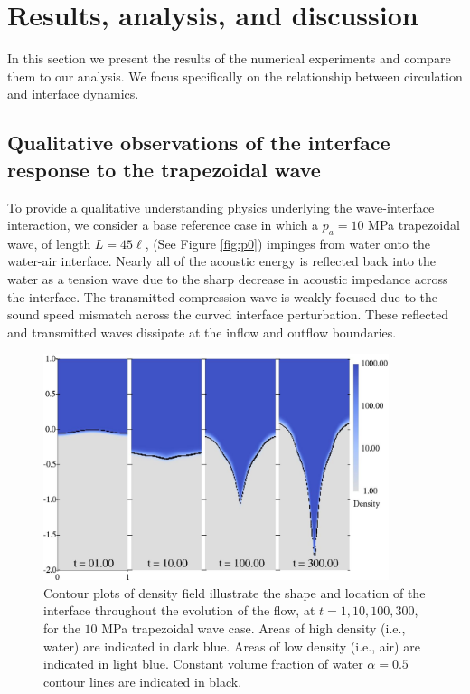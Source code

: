 \section{Results, analysis, and discussion}%
\label{sec:results}%
% 
In this section we present the results of the numerical experiments
and compare them to our analysis. We focus specifically on the
relationship between circulation and interface dynamics.
% 
% 
\subsection{Qualitative observations of the interface response to the trapezoidal wave}
\label{subsec:Qualitative}
To provide a qualitative understanding physics underlying the
wave-interface interaction, we consider a base reference case in which
a $p_a=10$ MPa trapezoidal wave, of length $L=45\ell$, (See Figure
\ref{fig:p0}) impinges from water onto the water-air interface. Nearly
all of the acoustic energy is reflected back into the water as a
tension wave due to the sharp decrease in acoustic impedance across
the interface. The transmitted compression wave is weakly focused due
to the sound speed mismatch across the curved interface
perturbation. These reflected and transmitted waves dissipate at the
inflow and outflow boundaries.
% 
\begin{figure}[h] 
  \centering
  \includegraphics[width=0.9\textwidth]{./figs/lung_figs/snapshots_density_t1}
  \caption[The evolution of the acoustically perturbed interface]
  {Contour plots of density field illustrate the shape and location of
    the interface throughout the evolution of the flow, at
    $t=1, 10, 100, 300$, for the $10$ MPa trapezoidal wave case. Areas
    of high density (i.e., water) are indicated in dark blue. Areas of
    low density (i.e., air) are indicated in light blue. Constant volume
    fraction of water $\alpha = 0.5$ contour lines are indicated in black.}
  \label{fig:interface_snapshots}
\end{figure}
